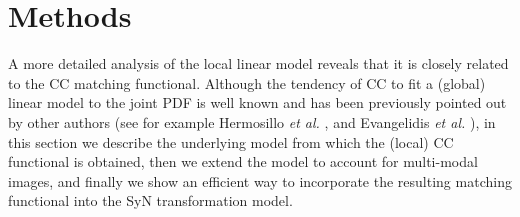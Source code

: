 \vspace{-0.5cm}
\section{Methods}\label{sec:methods}
A more detailed analysis of the local linear model reveals that it is closely related to the CC matching functional. Although the tendency of CC to fit a (global) linear model to the joint PDF is well known and has been previously pointed out by other authors (see for example Hermosillo {\it et al.} \cite{Hermosillo2004}, and Evangelidis {\it et al.} \cite{Evangelidis2008}), in this section we describe the underlying model from which the (local) CC functional is obtained, then we extend the model to account for multi-modal images, and finally we show an efficient way to incorporate the resulting matching functional into the SyN transformation model.

